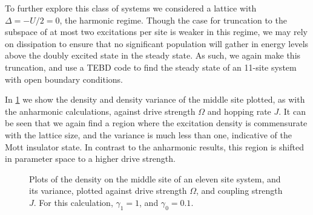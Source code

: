 To further explore this class of systems we considered a lattice with \(\Delta = -U/2 = 0\), the harmonic regime. Though the case for truncation to the subspace of at most two excitations per site is weaker in this regime, we may rely on dissipation to ensure that no significant population will gather in energy levels above the doubly excited state in the steady state. As such, we again make this truncation, and use a TEBD code to find the steady state of an 11-site system with open boundary conditions.

In \cref{fig:dnlca5-1} we show the density and density variance of the middle site plotted, as with the anharmonic calculations, against drive strength \(\Omega\) and hopping rate \(J\). It can be seen that we again find a region where the excitation density is commensurate with the lattice size, and the variance is much less than one, indicative of the Mott insulator state. In contrast to the anharmonic results, this region is shifted in parameter space to a higher drive strength.

\begin{figure}[ht]
	 \hfill
	\caption{\label{fig:dnlca5-1} Plots of the density on the middle site of an eleven site system, and its variance, plotted against drive strength \(\Omega\), and coupling strength \(J\). For this calculation, \(\gamma_{1} = 1\), and \(\gamma_{0} = 0.1\).}
\end{figure}

